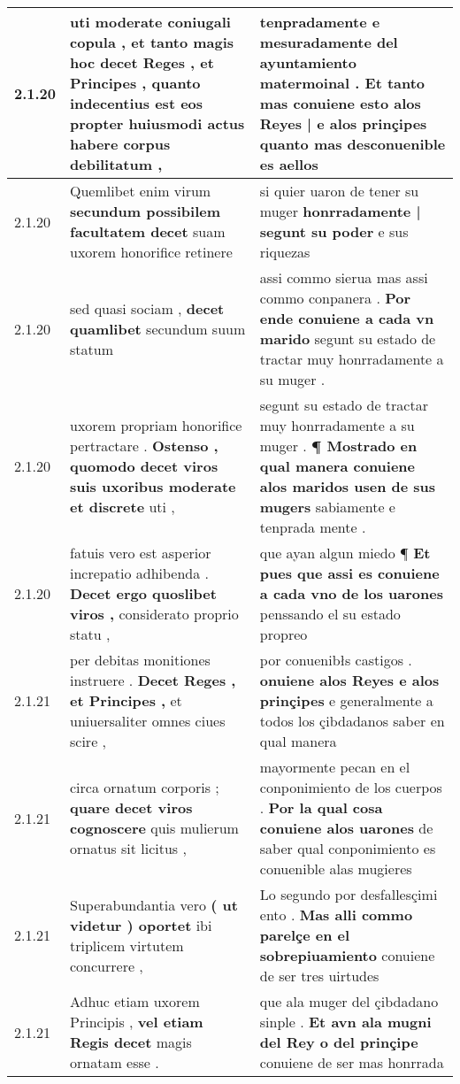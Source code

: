 \begin{tabular}{|p{1cm}|p{6.5cm}|p{6.5cm}|}
2.1.20 & uti moderate coniugali copula , \textbf{ et tanto magis hoc decet Reges , et Principes , } quanto indecentius est eos propter huiusmodi actus habere corpus debilitatum , & tenpradamente e mesuradamente del ayuntamiento matermoinal . \textbf{ Et tanto mas conuiene esto alos Reyes | e alos prinçipes } quanto mas desconuenible es aellos \\\hline
2.1.20 & Quemlibet enim virum \textbf{ secundum possibilem facultatem decet } suam uxorem honorifice retinere & si quier uaron de tener su muger \textbf{ honrradamente | segunt su poder } e sus riquezas \\\hline
2.1.20 & sed quasi sociam , \textbf{ decet quamlibet } secundum suum statum & assi commo sierua mas assi commo conpanera . \textbf{ Por ende conuiene a cada vn marido } segunt su estado de tractar muy honrradamente a su muger . \\\hline
2.1.20 & uxorem propriam honorifice pertractare . \textbf{ Ostenso , quomodo decet viros suis uxoribus moderate et discrete } uti , & segunt su estado de tractar muy honrradamente a su muger . \textbf{ ¶ Mostrado en qual manera conuiene alos maridos usen de sus mugers } sabiamente e tenprada mente . \\\hline
2.1.20 & fatuis vero est asperior increpatio adhibenda . \textbf{ Decet ergo quoslibet viros , } considerato proprio statu , & que ayan algun miedo ¶ \textbf{ Et pues que assi es conuiene a cada vno de los uarones } penssando el su estado propreo \\\hline
2.1.21 & per debitas monitiones instruere . \textbf{ Decet Reges , et Principes , } et uniuersaliter omnes ciues scire , & por conuenibłs castigos . \textbf{ onuiene alos Reyes e alos prinçipes } e generalmente a todos los çibdadanos saber en qual manera \\\hline
2.1.21 & circa ornatum corporis ; \textbf{ quare decet viros cognoscere } quis mulierum ornatus sit licitus , & mayormente pecan en el conponimiento de los cuerpos . \textbf{ Por la qual cosa conuiene alos uarones } de saber qual conponimiento es conuenible alas mugieres \\\hline
2.1.21 & Superabundantia vero \textbf{ ( ut videtur ) oportet } ibi triplicem virtutem concurrere , & Lo segundo por desfallesçimi ento . \textbf{ Mas alli commo parelçe en el sobrepiuamiento } conuiene de ser tres uirtudes \\\hline
2.1.21 & Adhuc etiam uxorem Principis , \textbf{ vel etiam Regis decet } magis ornatam esse . & que ala muger del çibdadano sinple . \textbf{ Et avn ala mugni del Rey o del prinçipe } conuiene de ser mas honrrada \\\hline

\end{tabular}
